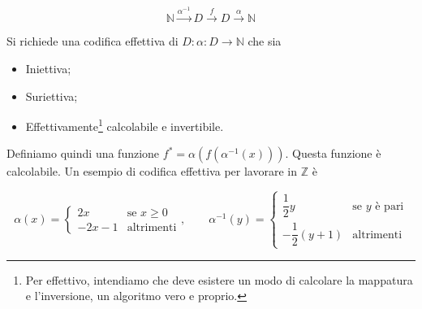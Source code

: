 	$$\mathbb{N} \xrightarrow{\alpha^{-1}} D \xrightarrow{f} D \xrightarrow{\alpha} \mathbb{N}$$
	
	Si richiede una codifica effettiva di $D: \alpha: D \to \mathbb{N}$ che sia
	\begin{itemize}
		\item Iniettiva;
		\item Suriettiva;
		\item Effettivamente\footnote{Per effettivo, intendiamo che deve esistere un modo di calcolare la mappatura e l'inversione, un algoritmo vero e proprio.} calcolabile e invertibile.
	\end{itemize}
	
	Definiamo quindi una funzione $f^* = \alpha (f(\alpha^{-1}(x)))$. Questa funzione è calcolabile.
	Un esempio di codifica effettiva per lavorare in $\mathbb{Z}$ è
	
	$$
	\alpha(x) = \begin{cases}
	2x & \text{se } x \geq 0\\
	-2x -1 & \text{altrimenti}
	\end{cases},
	\qquad
	\alpha^{-1}(y) = \begin{cases}
		\dfrac{1}{2}y & \text{se } y \text{ è pari}\\
		-\dfrac{1}{2}(y+1) & \text{altrimenti}
	\end{cases}
	$$
